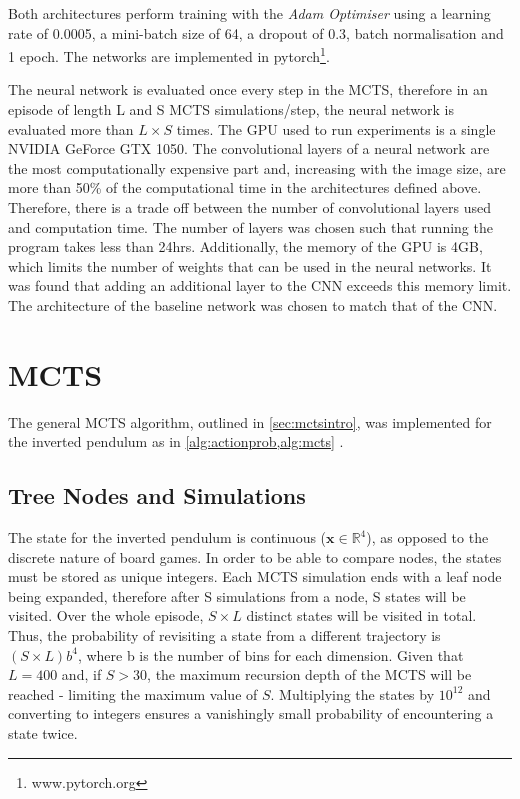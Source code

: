 \documentclass[../main.tex]{subfiles}
\begin{document}
Both architectures perform training with the \textit{Adam Optimiser} using a learning rate of 0.0005, a mini-batch size of 64, a dropout of 0.3, batch normalisation and 1 epoch. The networks are implemented in pytorch\footnote{www.pytorch.org}.

The neural network is evaluated once every step in the MCTS, therefore in an episode of length L and S MCTS simulations/step, the neural network is evaluated more than $L\times S$ times. The GPU used to run experiments is a single NVIDIA GeForce GTX 1050. The convolutional layers of a neural network are the most computationally expensive part and, increasing with the image size, are more than 50\% of the computational time in the architectures defined above. Therefore, there is a trade off between the number of convolutional layers used and computation time. The number of layers was chosen such that running the program takes less than 24hrs. Additionally, the memory of the GPU is 4GB, which limits the number of weights that can be used in the neural networks. It was found that adding an additional layer to the CNN exceeds this memory limit. The architecture of the baseline network was chosen to match that of the CNN.

\section{MCTS}

The general MCTS algorithm, outlined in \cref{sec:mctsintro}, was implemented for the inverted pendulum as in \cref{alg:actionprob,alg:mcts} .

\subsection{Tree Nodes and Simulations}

The state for the inverted pendulum is continuous ($\boldsymbol{x} \in \mathbb{R}^4$), as opposed to the discrete nature of board games. In order to be able to compare nodes, the states must be stored as unique integers. Each MCTS simulation ends with a leaf node being expanded, therefore after S simulations from a node, S states will be visited. Over the whole episode, $S\times L$ distinct states will be visited in total. Thus, the probability of revisiting a state from a different trajectory is $(S \times L)b^4$, where b is the number of bins for each dimension. Given that $L=400$ and, if $S>30$, the maximum recursion depth of the MCTS will be reached - limiting the maximum value of $S$. Multiplying the states by $10^{12}$ and converting to integers ensures a vanishingly small probability of encountering a state twice.
\end{document}
